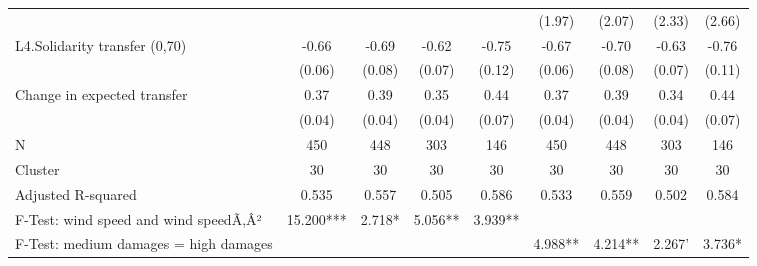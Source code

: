 {\begin{tabular}{l*{8}{c}}
                    &                     &                     &                     &                     &      (1.97)         &      (2.07)         &      (2.33)         &      (2.66)         \\
L4.Solidarity transfer (0,70)&       -0.66\sym{***}&       -0.69\sym{***}&       -0.62\sym{***}&       -0.75\sym{***}&       -0.67\sym{***}&       -0.70\sym{***}&       -0.63\sym{***}&       -0.76\sym{***}\\
                    &      (0.06)         &      (0.08)         &      (0.07)         &      (0.12)         &      (0.06)         &      (0.08)         &      (0.07)         &      (0.11)         \\
Change in expected transfer&        0.37\sym{***}&        0.39\sym{***}&        0.35\sym{***}&        0.44\sym{***}&        0.37\sym{***}&        0.39\sym{***}&        0.34\sym{***}&        0.44\sym{***}\\
                    &      (0.04)         &      (0.04)         &      (0.04)         &      (0.07)         &      (0.04)         &      (0.04)         &      (0.04)         &      (0.07)         \\
\midrule
N                   &         450         &         448         &         303         &         146         &         450         &         448         &         303         &         146         \\
Cluster             &          30         &          30         &          30         &          30         &          30         &          30         &          30         &          30         \\
Adjusted R-squared  &       0.535         &       0.557         &       0.505         &       0.586         &       0.533         &       0.559         &       0.502         &       0.584         \\
F-Test: wind speed and wind speedÃ‚Â²&   15.200***         &      2.718*         &     5.056**         &     3.939**         &                     &                     &                     &                     \\
F-Test: medium damages = high damages&                     &                     &                     &                     &     4.988**         &     4.214**         &      2.267'         &      3.736*         \\
\bottomrule
\end{tabular}
}
